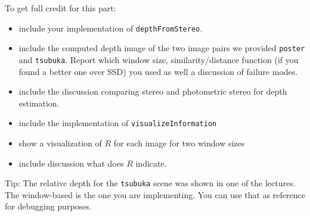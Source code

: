 \documentclass[10pt,letterpaper]{article}
\newcommand{\cmd}[1] {{\color{blue}\texttt{#1}}}
\begin{document}
\begin{enumerate}

%        
\end{enumerate}

To get full credit for this part:

\begin{itemize}
\item include your implementation of \cmd{depthFromStereo}.
\item include the computed depth image of the two image pairs we provided \cmd{poster} and \cmd{tsubuka}.
Report which window size, similarity/distance function (if you found a
better one over SSD) you used as well a discussion of failure modes.
\item include the discussion comparing stereo and photometric stereo for depth estimation.
\item include the implementation of \cmd{visualizeInformation}
\item show a visualization of $R$ for each image for two window sizes
\item include discussion what does $R$ indicate.
\end{itemize}

Tip: The relative depth for the \cmd{tsubuka} scene was shown in one of the lectures.
The window-based is the one you are implementing.
You can use that as reference for debugging purposes.
\end{document}
